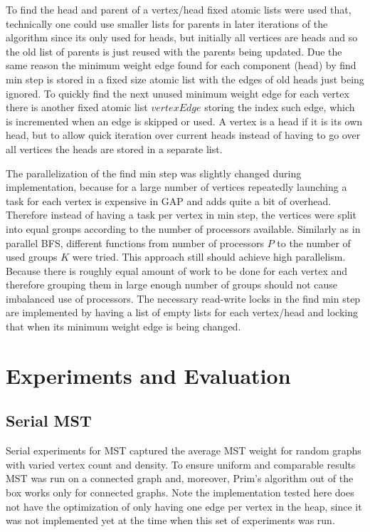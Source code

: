 \documentclass{report}
\theoremstyle{plain}
\theoremstyle{definition}
\theoremstyle{remark}
\begin{document}
To find the head and parent of a vertex/head fixed atomic lists were used that, technically one could use smaller lists for parents in later iterations of the algorithm since its only used for heads, but initially all vertices are heads and so the old list of parents is just reused with the parents being updated. Due the same reason the minimum weight edge found for each component (head) by find min step is stored in a fixed size atomic list with the edges of old heads just being ignored. To quickly find the next unused minimum weight edge for each vertex there is another fixed atomic list $vertexEdge$ storing the index such edge, which is incremented when an edge is skipped or used. A vertex is a head if it is its own head, but to allow quick iteration over current heads instead of having to go over all vertices the heads are stored in a separate list.

The parallelization of the find min step was slightly changed during implementation, because for a large number of vertices repeatedly launching a task for each vertex is expensive in GAP and adds quite a bit of overhead. Therefore instead of having a task per vertex in min step, the vertices were split into equal groups according to the number of processors available. Similarly as in parallel BFS, different functions from number of processors $P$ to the number of used groups $K$ were tried.
This approach still should achieve high parallelism. Because there is roughly equal amount of work to be done for each vertex and therefore grouping them in large enough number of groups should not cause imbalanced use of processors. 
The necessary read-write locks in the find min step are implemented by having a list of empty lists for each vertex/head and locking that when its minimum weight edge is being changed.

\section{Experiments and Evaluation}

\subsection{Serial MST}

Serial experiments for MST captured the average MST weight for random graphs with varied vertex count and density. To ensure uniform and comparable results MST was run on a connected graph and, moreover, Prim's algorithm out of the box works only for connected graphs. Note the implementation tested here does not have the optimization of only having one edge per vertex in the heap, since it was not implemented yet at the time when this set of experiments was run.
\end{document}
